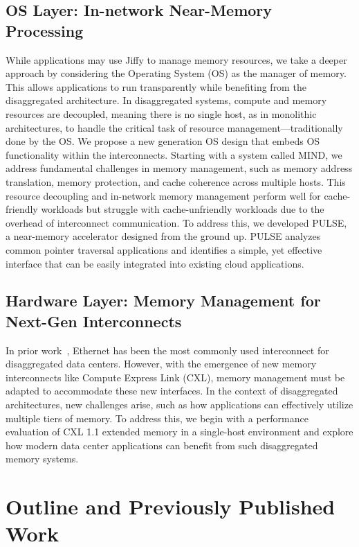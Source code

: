 \subsection{OS Layer: In-network Near-Memory Processing}

While applications may use Jiffy to manage memory resources, we take a deeper approach by considering the Operating System (OS) as the manager of memory. This allows applications to run transparently while benefiting from the disaggregated architecture. In disaggregated systems, compute and memory resources are decoupled, meaning there is no single host, as in monolithic architectures, to handle the critical task of resource management—traditionally done by the OS. We propose a new generation OS design that embeds OS functionality within the interconnects. Starting with a system called MIND, we address fundamental challenges in memory management, such as memory address translation, memory protection, and cache coherence across multiple hosts. This resource decoupling and in-network memory management perform well for cache-friendly workloads but struggle with cache-unfriendly workloads due to the overhead of interconnect communication. To address this, we developed PULSE, a near-memory accelerator designed from the ground up. PULSE analyzes common pointer traversal applications and identifies a simple, yet effective interface that can be easily integrated into existing cloud applications.

\subsection{Hardware Layer: Memory Management for Next-Gen Interconnects}
In prior work~\cite{mind,legoos}, Ethernet has been the most commonly used interconnect for disaggregated data centers. However, with the emergence of new memory interconnects like Compute Express Link (CXL), memory management must be adapted to accommodate these new interfaces. In the context of disaggregated architectures, new challenges arise, such as how applications can effectively utilize multiple tiers of memory. To address this, we begin with a performance evaluation of CXL 1.1 extended memory in a single-host environment and explore how modern data center applications can benefit from such disaggregated memory systems.

\section{Outline and Previously Published Work}

